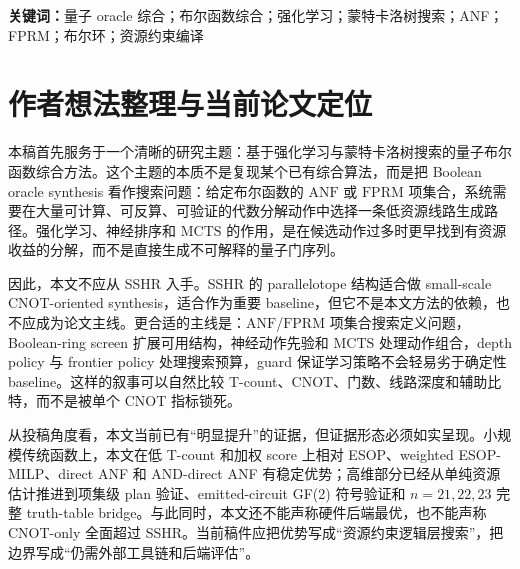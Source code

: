 \documentclass[UTF8,fontset=macnew,11pt]{ctexart}
\newcommand{\method}{Resource-NMCTS}
\newcommand{\anf}{\ensuremath{\mathrm{ANF}}}
\newcommand{\fprm}{\ensuremath{\mathrm{FPRM}}}
\newcommand{\mcts}{\ensuremath{\mathrm{MCTS}}}
\newcommand{\ttable}{truth-table}
\newcommand{\mct}{\ensuremath{\mathrm{MCT}}}
\begin{document}
\begin{abstract}
所有 6600 个项集级方法行均通过 factor-plan \anf{} 展开验证和 emitted X/CNOT/\mct{} circuit 的 GF(2) 多项式符号模拟验证；进一步的 $n=21,22,23$ bridge、large-policy $n=23$ rerun 和 cost-aware $n=23$ rerun 中，300/300 个方法行同时通过完整 \ttable{} oracle 验证、plan 验证和 emitted-circuit 符号验证。新增 emitted-circuit schedule proxy 显示，large frontier policy 在 $n=23$ 完整 bridge 上相对旧 policy 为 1/0/5，平均 score 再降 0.48\%，T-depth proxy 再降 0.45\%；cost-aware policy 则相对 large policy 以 +0.92\% score 代价换取 56.29\% plan time 下降和 12.62\% lifetime area 下降。本文的阶段性结论是：\method{} 已形成一条独立于 SSHR、以低 T-count 和低加权逻辑资源为目标的 Boolean oracle synthesis 主线；但 RevKit API 结果表明，论文若要投稿为强算法贡献，还需要增加 phase/Rz-aware 口径并处理非 Clifford 旋转综合成本，或者明确限制 bit-flip oracle 目标，并继续补官方 ROS/mockturtle 与后端相关评估。
\end{abstract}

\noindent\textbf{关键词：}量子 oracle 综合；布尔函数综合；强化学习；蒙特卡洛树搜索；ANF；FPRM；布尔环；资源约束编译

\section*{作者想法整理与当前论文定位}

本稿首先服务于一个清晰的研究主题：基于强化学习与蒙特卡洛树搜索的量子布尔函数综合方法。这个主题的本质不是复现某个已有综合算法，而是把 Boolean oracle synthesis 看作搜索问题：给定布尔函数的 \anf{} 或 \fprm{} 项集合，系统需要在大量可计算、可反算、可验证的代数分解动作中选择一条低资源线路生成路径。强化学习、神经排序和 \mcts{} 的作用，是在候选动作过多时更早找到有资源收益的分解，而不是直接生成不可解释的量子门序列。

因此，本文不应从 SSHR 入手。SSHR 的 parallelotope 结构适合做 small-scale CNOT-oriented synthesis，适合作为重要 baseline，但它不是本文方法的依赖，也不应成为论文主线。更合适的主线是：\anf{}/\fprm{} 项集合搜索定义问题，Boolean-ring screen 扩展可用结构，神经动作先验和 \mcts{} 处理动作组合，depth policy 与 frontier policy 处理搜索预算，guard 保证学习策略不会轻易劣于确定性 baseline。这样的叙事可以自然比较 T-count、CNOT、门数、线路深度和辅助比特，而不是被单个 CNOT 指标锁死。

从投稿角度看，本文当前已有“明显提升”的证据，但证据形态必须如实呈现。小规模传统函数上，本文在低 T-count 和加权 score 上相对 ESOP、weighted ESOP-MILP、direct ANF 和 AND-direct ANF 有稳定优势；高维部分已经从单纯资源估计推进到项集级 plan 验证、emitted-circuit GF(2) 符号验证和 $n=21,22,23$ 完整 \ttable{} bridge。与此同时，本文还不能声称硬件后端最优，也不能声称 CNOT-only 全面超过 SSHR。当前稿件应把优势写成“资源约束逻辑层搜索”，把边界写成“仍需外部工具链和后端评估”。
\end{document}
